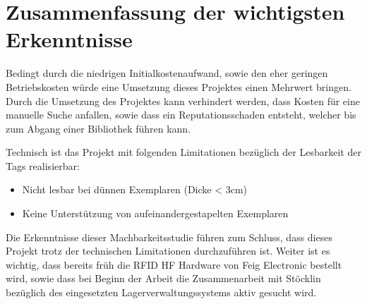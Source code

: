 \chapter{Zusammenfassung der wichtigsten Erkenntnisse}
Bedingt durch die niedrigen Initialkostenaufwand, sowie den eher geringen Betriebskosten würde eine Umsetzung dieses Projektes einen Mehrwert bringen.
Durch die Umsetzung des Projektes kann verhindert werden, dass Kosten für eine manuelle Suche anfallen, sowie dass ein Reputationsschaden entsteht, welcher bis zum Abgang einer Bibliothek führen kann.

\vspace{2em}

\noindent

Technisch ist das Projekt mit folgenden Limitationen bezüglich der Lesbarkeit der Tags realisierbar:
\begin{itemize}
	\item Nicht lesbar bei dünnen Exemplaren (Dicke < 3cm)
	\item Keine Unterstützung von aufeinandergestapelten Exemplaren
\end{itemize}

\vspace{2em}

\noindent
Die Erkenntnisse dieser Machbarkeitsstudie führen zum Schluss, dass dieses Projekt trotz der technischen Limitationen durchzuführen ist.
Weiter ist es wichtig, dass bereits früh die RFID HF Hardware von Feig Electronic bestellt wird, sowie dass bei Beginn der Arbeit die Zusammenarbeit mit Stöcklin bezüglich des eingesetzten Lagerverwaltungssystems aktiv gesucht wird.
